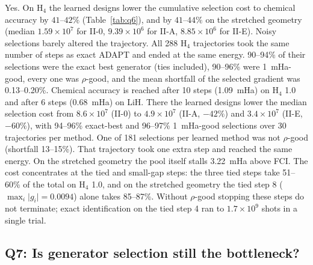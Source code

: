 \documentclass[aps,pra,reprint,superscriptaddress,nofootinbib]{revtex4-2}
\begin{document}
Yes. On H$_4$ the learned designs lower the cumulative selection cost to chemical accuracy by $41$--$42\%$ (Table~\ref{tab:q6}), and by $41$--$44\%$ on the stretched geometry (median $1.59\times10^7$ for II-0, $9.39\times10^6$ for II-A, $8.85\times10^6$ for II-E). Noisy selections barely altered the trajectory. All 288 H$_4$ trajectories took the same number of steps as exact ADAPT and ended at the same energy. 90--94\% of their selections were the exact best generator (ties included), 90--96\% were 1~mHa-good, every one was $\rho$-good, and the mean shortfall of the selected gradient was 0.13--0.20\%. Chemical accuracy is reached after 10 steps (1.09~mHa) on H$_4$ 1.0 and after 6 steps (0.68~mHa) on LiH. There the learned designs lower the median selection cost from $8.6\times10^7$ (II-0) to $4.9\times10^7$ (II-A, $-42\%$) and $3.4\times10^7$ (II-E, $-60\%$), with 94--96\% exact-best and 96--97\% 1~mHa-good selections over 30 trajectories per method. One of 181 selections per learned method was not $\rho$-good (shortfall 13--15\%). That trajectory took one extra step and reached the same energy. On the stretched geometry the pool itself stalls 3.22~mHa above FCI. The cost concentrates at the tied and small-gap steps: the three tied steps take 51--60\% of the total on H$_4$ 1.0, and on the stretched geometry the tied step 8 ($\max_i\lvert g_i\rvert=0.0094$) alone takes 85--87\%. Without $\rho$-good stopping these steps do not terminate; exact identification on the tied step 4 ran to $1.7\times10^9$ shots in a single trial.

\subsection{Q7: Is generator selection still the bottleneck?}
\end{document}
